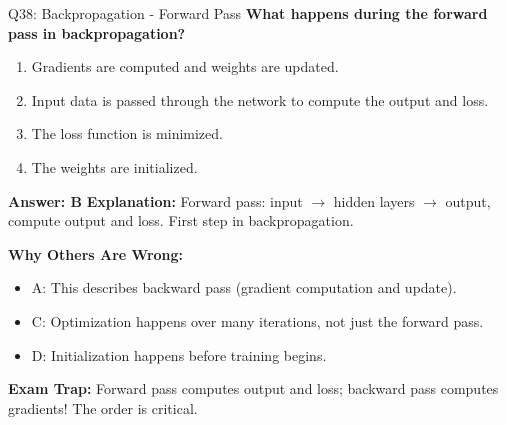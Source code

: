 \documentclass[8pt]{beamer}
\begin{document}
	\begin{frame}{Q38: Backpropagation - Forward Pass}
		\fontsize{6.5}{7.5}\selectfont
		\textbf{What happens during the forward pass in backpropagation?}
		
		\begin{enumerate}
			\item Gradients are computed and weights are updated.
			\item Input data is passed through the network to compute the output and loss.
			\item The loss function is minimized.
			\item The weights are initialized.
		\end{enumerate}
		
		\vspace{0.05cm}
		\textcolor{myblue}{\textbf{Answer: B}}
		\vspace{0.05cm}
		\textcolor{myblue}{\textbf{Explanation:}} Forward pass: input $\to$ hidden layers $\to$ output, compute output and loss. First step in backpropagation.
		
		\vspace{0.05cm}
		\textcolor{myred}{\textbf{Why Others Are Wrong:}}
		\begin{itemize}
			\item \textcolor{myred}{A:} This describes backward pass (gradient computation and update).
			\item \textcolor{myred}{C:} Optimization happens over many iterations, not just the forward pass.
			\item \textcolor{myred}{D:} Initialization happens before training begins.
		\end{itemize}
		
		\textcolor{myred}{\textbf{Exam Trap:}} Forward pass computes \textcolor{myblue}{output and loss}; backward pass computes gradients! The order is critical.
	\end{frame}
	
\end{document}
